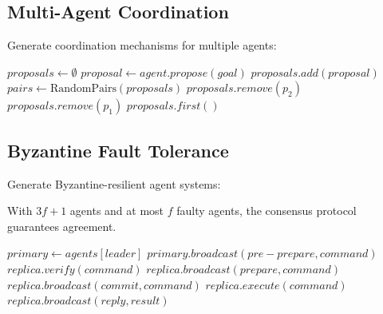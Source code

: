 \subsection{Multi-Agent Coordination}

Generate coordination mechanisms for multiple agents:

\begin{algorithm}
\caption{Consensus-Based Coordination}
\begin{algorithmic}[1]
    \State $proposals \gets \emptyset$
        \State $proposal \gets agent.propose(goal)$
        \State $proposals.add(proposal)$
    \EndFor
        \State $pairs \gets \text{RandomPairs}(proposals)$
                \State $proposals.remove(p_2)$
            \Else
                \State $proposals.remove(p_1)$
            \EndIf
        \EndFor
    \EndWhile
    \State \Return $proposals.first()$ 
\EndProcedure
\end{algorithmic}
\end{algorithm}

\subsection{Byzantine Fault Tolerance}

Generate Byzantine-resilient agent systems:

\begin{theorem}
    With $3f+1$ agents and at most $f$ faulty agents, the consensus protocol guarantees agreement.
\end{theorem}

\begin{algorithm}
\caption{Practical Byzantine Fault Tolerance}
\begin{algorithmic}[1]
    \State $primary \gets agents[leader]$
    \State $primary.broadcast(pre-prepare, command)$
        \State $replica.verify(command)$
        \State $replica.broadcast(prepare, command)$
    \EndFor
        \State $replica.broadcast(commit, command)$
    \EndIf
        \State $replica.execute(command)$
        \State $replica.broadcast(reply, result)$
    \EndIf
\EndProcedure
\end{algorithmic}
\end{algorithm}

